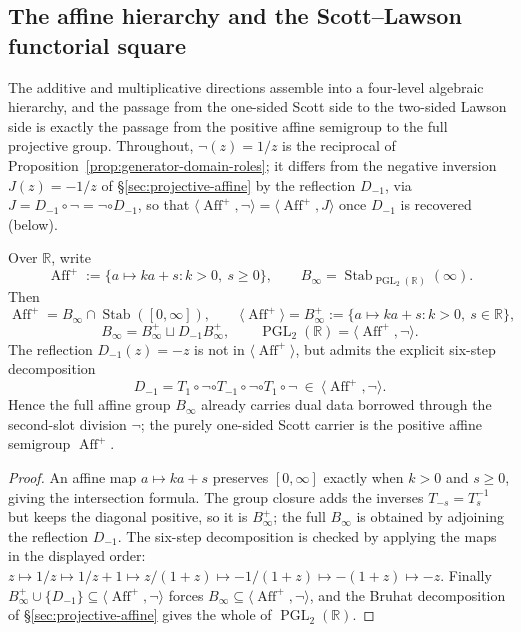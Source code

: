 \subsection{The affine hierarchy and the Scott--Lawson functorial square}

The additive and multiplicative directions assemble into a four-level algebraic
hierarchy, and the passage from the one-sided Scott side to the two-sided
Lawson side is exactly the passage from the positive affine semigroup to the
full projective group.  Throughout, $\neg(z)=1/z$ is the reciprocal of
Proposition~\ref{prop:generator-domain-roles}; it differs from the negative
inversion $J(z)=-1/z$ of \S\ref{sec:projective-affine} by the reflection
$D_{-1}$, via $J=D_{-1}\circ\neg=\neg\circ D_{-1}$, so that
$\langle\operatorname{Aff}^+,\neg\rangle=\langle\operatorname{Aff}^+,J\rangle$
once $D_{-1}$ is recovered (below).

\begin{lemma}
\label{lem:four-level-affine-hierarchy}
Over $\mathbb R$, write
\[
\operatorname{Aff}^+:=\{a\mapsto ka+s:k>0,\ s\ge0\},
\qquad
B_\infty=\operatorname{Stab}_{\operatorname{PGL}_2(\mathbb R)}(\infty).
\]
Then
\[
\operatorname{Aff}^+=B_\infty\cap\operatorname{Stab}([0,\infty]),
\qquad
\langle\operatorname{Aff}^+\rangle=B_\infty^+:=\{a\mapsto ka+s:k>0,\ s\in\mathbb R\},
\]
\[
B_\infty=B_\infty^+\sqcup D_{-1}B_\infty^+,
\qquad
\operatorname{PGL}_2(\mathbb R)=\langle\operatorname{Aff}^+,\neg\rangle .
\]
The reflection $D_{-1}(z)=-z$ is not in $\langle\operatorname{Aff}^+\rangle$, but
admits the explicit six-step decomposition
\[
D_{-1}=T_1\circ\neg\circ T_{-1}\circ\neg\circ T_1\circ\neg
\ \in\ \langle\operatorname{Aff}^+,\neg\rangle .
\]
Hence the full affine group $B_\infty$ already carries dual data borrowed
through the second-slot division $\neg$; the purely one-sided Scott carrier is
the positive affine semigroup $\operatorname{Aff}^+$.
\end{lemma}

\begin{proof}
An affine map $a\mapsto ka+s$ preserves $[0,\infty]$ exactly when $k>0$ and
$s\ge0$, giving the intersection formula.  The group closure adds the inverses
$T_{-s}=T_s^{-1}$ but keeps the diagonal positive, so it is $B_\infty^+$; the
full $B_\infty$ is obtained by adjoining the reflection $D_{-1}$.  The six-step
decomposition is checked by applying the maps in the displayed order:
$z\mapsto1/z\mapsto 1/z+1\mapsto z/(1+z)\mapsto -1/(1+z)\mapsto -(1+z)\mapsto -z$.
Finally $B_\infty^+\cup\{D_{-1}\}\subseteq\langle\operatorname{Aff}^+,\neg\rangle$
forces $B_\infty\subseteq\langle\operatorname{Aff}^+,\neg\rangle$, and the Bruhat
decomposition of \S\ref{sec:projective-affine} gives the whole of
$\operatorname{PGL}_2(\mathbb R)$.
\end{proof}

